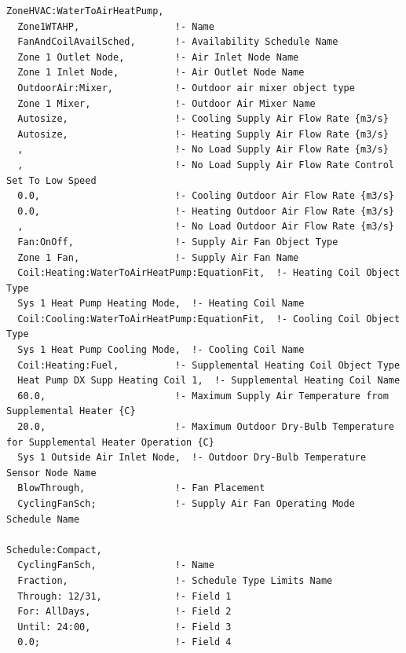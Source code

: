 \begin{lstlisting}
ZoneHVAC:WaterToAirHeatPump,
  Zone1WTAHP,                 !- Name
  FanAndCoilAvailSched,       !- Availability Schedule Name
  Zone 1 Outlet Node,         !- Air Inlet Node Name
  Zone 1 Inlet Node,          !- Air Outlet Node Name
  OutdoorAir:Mixer,           !- Outdoor air mixer object type
  Zone 1 Mixer,               !- Outdoor Air Mixer Name
  Autosize,                   !- Cooling Supply Air Flow Rate {m3/s}
  Autosize,                   !- Heating Supply Air Flow Rate {m3/s}
  ,                           !- No Load Supply Air Flow Rate {m3/s}
  ,                           !- No Load Supply Air Flow Rate Control Set To Low Speed
  0.0,                        !- Cooling Outdoor Air Flow Rate {m3/s}
  0.0,                        !- Heating Outdoor Air Flow Rate {m3/s}
  ,                           !- No Load Outdoor Air Flow Rate {m3/s}
  Fan:OnOff,                  !- Supply Air Fan Object Type
  Zone 1 Fan,                 !- Supply Air Fan Name
  Coil:Heating:WaterToAirHeatPump:EquationFit,  !- Heating Coil Object Type
  Sys 1 Heat Pump Heating Mode,  !- Heating Coil Name
  Coil:Cooling:WaterToAirHeatPump:EquationFit,  !- Cooling Coil Object Type
  Sys 1 Heat Pump Cooling Mode,  !- Cooling Coil Name
  Coil:Heating:Fuel,          !- Supplemental Heating Coil Object Type
  Heat Pump DX Supp Heating Coil 1,  !- Supplemental Heating Coil Name
  60.0,                       !- Maximum Supply Air Temperature from Supplemental Heater {C}
  20.0,                       !- Maximum Outdoor Dry-Bulb Temperature for Supplemental Heater Operation {C}
  Sys 1 Outside Air Inlet Node,  !- Outdoor Dry-Bulb Temperature Sensor Node Name
  BlowThrough,                !- Fan Placement
  CyclingFanSch;              !- Supply Air Fan Operating Mode Schedule Name

Schedule:Compact,
  CyclingFanSch,              !- Name
  Fraction,                   !- Schedule Type Limits Name
  Through: 12/31,             !- Field 1
  For: AllDays,               !- Field 2
  Until: 24:00,               !- Field 3
  0.0;                        !- Field 4


\end{lstlisting}
